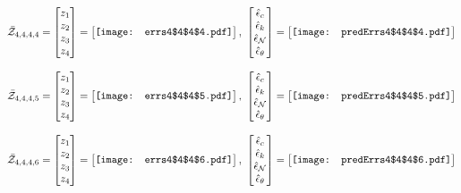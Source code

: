 \documentclass[12pt]{article}
\begin{document}
\begin{gather*}
\bar{\mathcal{Z}}_{4,4,4,4}=\begin{bmatrix}
z_1\\
z_2\\
z_3\\
z_4
 \end{bmatrix}= \begin{bmatrix}
\vcenter{\hbox{\texttt{[image: errs4\$4\$4\$4.pdf]}}}
 \end{bmatrix},\,\, \begin{bmatrix}
\hat{\epsilon}_c\\\hat{\epsilon}_k\\\hat{\epsilon}_\mathcal{N}\\\hat{\epsilon}_\theta
 \end{bmatrix}=\begin{bmatrix}
\vcenter{\hbox{\texttt{[image: predErrs4\$4\$4\$4.pdf]}}}
 \end{bmatrix}
\end{gather*}

\begin{gather*}
\bar{\mathcal{Z}}_{4,4,4,5}=\begin{bmatrix}
z_1\\
z_2\\
z_3\\
z_4
 \end{bmatrix}= \begin{bmatrix}
\vcenter{\hbox{\texttt{[image: errs4\$4\$4\$5.pdf]}}}
 \end{bmatrix},\,\, \begin{bmatrix}
\hat{\epsilon}_c\\\hat{\epsilon}_k\\\hat{\epsilon}_\mathcal{N}\\\hat{\epsilon}_\theta
 \end{bmatrix}=\begin{bmatrix}
\vcenter{\hbox{\texttt{[image: predErrs4\$4\$4\$5.pdf]}}}
 \end{bmatrix}
\end{gather*}


\begin{gather*}
\bar{\mathcal{Z}}_{4,4,4,6}=\begin{bmatrix}
z_1\\
z_2\\
z_3\\
z_4
 \end{bmatrix}= \begin{bmatrix}
\vcenter{\hbox{\texttt{[image: errs4\$4\$4\$6.pdf]}}}
 \end{bmatrix},\,\, \begin{bmatrix}
\hat{\epsilon}_c\\\hat{\epsilon}_k\\\hat{\epsilon}_\mathcal{N}\\\hat{\epsilon}_\theta
 \end{bmatrix}=\begin{bmatrix}
\vcenter{\hbox{\texttt{[image: predErrs4\$4\$4\$6.pdf]}}}
 \end{bmatrix}
\end{gather*}
\end{document}
